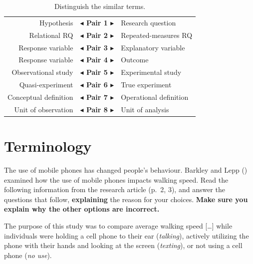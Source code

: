 \documentclass[
  11pt,
  a4paper,
  krantz2]{krantz}
\makeatletter
\renewenvironment{quote}%
{\begin{kframe}}
{\end{kframe}}
\newenvironment{kframe}{%
\medskip{}
\setlength{\fboxsep}{.8em}
 \def\at@end@of@kframe{}%
 \ifinner\ifhmode%
  \def\at@end@of@kframe{\end{minipage}}%
  \begin{minipage}{\columnwidth}%
 \fi\fi%
 \def\FrameCommand##1{\hskip\@totalleftmargin \hskip-\fboxsep
 \colorbox{shadecolor}{##1}\hskip-\fboxsep
     \hskip-\linewidth \hskip-\@totalleftmargin \hskip\columnwidth}%
 \MakeFramed {\advance\hsize-\width
   \@totalleftmargin\z@ \linewidth\hsize
   \@setminipage}}%
 {\par\unskip\endMakeFramed%
 \at@end@of@kframe}
\renewenvironment{quote}
               {\list{}{\vspace{-0.5em}\begin{kframe}\small%
                        \rightmargin   \leftmargin
                        \parsep        \z@ \@plus\p@}%
                \item\relax}
               {\end{kframe}\endlist}
\makeatother
\begin{document}
\begin{table}
\centering
\caption{\label{tab:SimilarTerms}Distinguish the similar terms.}
\centering
\fontsize{10}{12}\selectfont
\begin{tabular}[t]{r>{}cl}
\toprule
Hypothesis & \textbf{$\blacktriangleleft$ Pair 1 $\blacktriangleright$} & Research question\\
Relational RQ & \textbf{$\blacktriangleleft$ Pair 2 $\blacktriangleright$} & Repeated-measures RQ\\
\addlinespace
Response variable & \textbf{$\blacktriangleleft$ Pair 3 $\blacktriangleright$} & Explanatory variable\\
Response variable & \textbf{$\blacktriangleleft$ Pair 4 $\blacktriangleright$} & Outcome\\
\addlinespace
Observational study & \textbf{$\blacktriangleleft$ Pair 5 $\blacktriangleright$} & Experimental study\\
Quasi-experiment & \textbf{$\blacktriangleleft$ Pair 6 $\blacktriangleright$} & True experiment\\
\addlinespace
Conceptual definition & \textbf{$\blacktriangleleft$ Pair 7 $\blacktriangleright$} & Operational definition\\
Unit of observation & \textbf{$\blacktriangleleft$ Pair 8 $\blacktriangleright$} & Unit of analysis\\
\bottomrule
\end{tabular}
\end{table}

\section{Terminology}\label{UnderstandingTerminology2}

The use of mobile phones has changed people's behaviour.
Barkley and Lepp () examined how the use of mobile phones impacts walking speed.
Read the following information from the research article (p.~2, 3), and answer the questions that follow, \textbf{explaining} the reason for your choices.
\textbf{Make sure you explain why the other options are incorrect.}

\begin{quote}
The purpose of this study was to compare average walking speed {[}\ldots{]} while individuals were holding a cell phone to their ear (\emph{talking}), actively utilizing the phone with their hands and looking at the screen (\emph{texting}), or not using a cell phone (\emph{no use}).
\end{quote}
\end{document}
